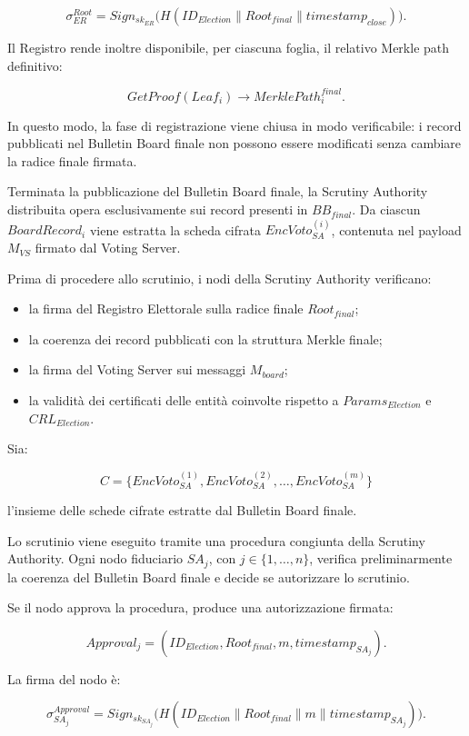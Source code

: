 \documentclass[a4paper,12pt]{article}
\begin{document}
\[
	\sigma_{ER}^{Root} =
	Sign_{sk_{ER}}
	\big(
	H(ID_{Election} \parallel Root_{final} \parallel timestamp_{close})
	\big).
\]

Il Registro rende inoltre disponibile, per ciascuna foglia, il relativo Merkle path definitivo:

\[
	GetProof(Leaf_i) \rightarrow MerklePath_i^{final}.
\]

In questo modo, la fase di registrazione viene chiusa in modo verificabile: i record pubblicati nel Bulletin Board finale non possono essere modificati senza cambiare la radice finale firmata.

Terminata la pubblicazione del Bulletin Board finale, la Scrutiny Authority distribuita opera esclusivamente sui record presenti in \(BB_{final}\).
Da ciascun \(BoardRecord_i\) viene estratta la scheda cifrata \(EncVoto_{SA}^{(i)}\), contenuta nel payload \(M_{VS}\) firmato dal Voting Server.

Prima di procedere allo scrutinio, i nodi della Scrutiny Authority verificano:
\begin{itemize}
	\item la firma del Registro Elettorale sulla radice finale \(Root_{final}\);
	\item la coerenza dei record pubblicati con la struttura Merkle finale;
	\item la firma del Voting Server sui messaggi \(M_{board}\);
	\item la validit\`a dei certificati delle entit\`a coinvolte rispetto a \(Params_{Election}\) e \(CRL_{Election}\).
\end{itemize}

Sia:

\[
	C =
	\{EncVoto_{SA}^{(1)}, EncVoto_{SA}^{(2)}, \dots, EncVoto_{SA}^{(m)}\}
\]

l'insieme delle schede cifrate estratte dal Bulletin Board finale.

Lo scrutinio viene eseguito tramite una procedura congiunta della Scrutiny Authority.
Ogni nodo fiduciario \(SA_j\), con \(j \in \{1,\dots,n\}\), verifica preliminarmente la coerenza del Bulletin Board finale e decide se autorizzare lo scrutinio.

Se il nodo approva la procedura, produce una autorizzazione firmata:

\[
	Approval_j =
	(ID_{Election}, Root_{final}, m, timestamp_{SA_j}).
\]

La firma del nodo \`e:

\[
	\sigma_{SA_j}^{Approval} =
	Sign_{sk_{SA_j}}
	\big(
	H(ID_{Election} \parallel Root_{final} \parallel m \parallel timestamp_{SA_j})
	\big).
\]
\end{document}
